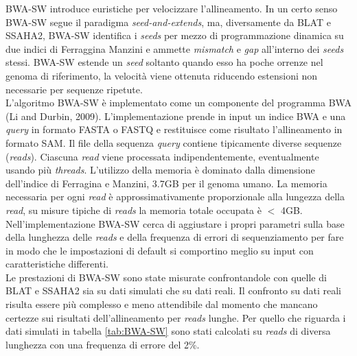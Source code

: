 \documentclass[conference]{IEEEtran}
\begin{document}
BWA-SW introduce euristiche per velocizzare l'allineamento. In un certo senso BWA-SW segue il paradigma \textit{seed-and-extends}, ma, diversamente da BLAT e SSAHA2, BWA-SW identifica i \textit{seeds} per mezzo di programmazione dinamica su due indici di Ferraggina Manzini e ammette \textit{mismatch} e \textit{gap} all'interno dei \textit{seeds} stessi. BWA-SW estende un \textit{seed} soltanto quando esso ha poche orrenze nel genoma di riferimento, la velocità viene ottenuta riducendo estensioni non necessarie per sequenze ripetute.\\

L'algoritmo BWA-SW è implementato come un componente del programma BWA (Li and Durbin, 2009). L'implementazione prende in input un indice BWA e una \textit{query} in formato FASTA o FASTQ e restituisce come risultato l'allineamento in formato SAM. Il file della sequenza \textit{query} contiene tipicamente diverse sequenze (\textit{reads}). Ciascuna \textit{read} viene processata indipendentemente, eventualmente usando più \textit{threads}. L'utilizzo della memoria è dominato dalla dimensione dell'indice di Ferragina e Manzini, 3.7GB per il genoma umano. La memoria necessaria per ogni \textit{read} è approssimativamente proporzionale alla lungezza della \textit{read}, su misure tipiche di \textit{reads} la memoria totale occupata è $<$ 4GB.\\

Nell'implementazione BWA-SW cerca di aggiustare i propri parametri sulla base della lunghezza delle \textit{reads} e della frequenza di errori di sequenziamento per fare in modo che le impostazioni di default si comportino meglio su input con caratteristiche differenti.\\

Le prestazioni di BWA-SW sono state misurate confrontandole con quelle di BLAT e SSAHA2 sia su dati simulati che su dati reali. Il confronto su dati reali risulta essere più complesso e meno attendibile dal momento che mancano certezze sui risultati dell'allineamento per \textit{reads} lunghe. Per quello che riguarda i dati simulati in tabella \ref{tab:BWA-SW} sono stati calcolati su \textit{reads} di diversa lunghezza con una frequenza di errore del 2\%.
\end{document}

